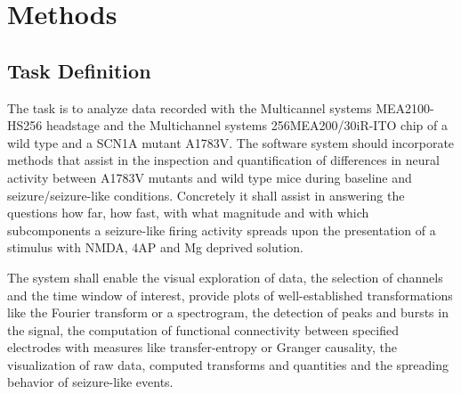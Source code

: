 \documentclass[11pt, twocolumn]{article}
\begin{document}
\section{Methods}
\subsection{Task Definition}
	The task is to analyze data recorded with the Multicannel systems MEA2100-HS256 headstage and the Multichannel systems 256MEA200/30iR-ITO chip of a wild type and a SCN1A mutant A1783V.
	The software system should incorporate methods that assist in the inspection and quantification of differences in neural activity between A1783V mutants and wild type mice during baseline and seizure/seizure-like conditions.
	Concretely it shall assist in answering the questions how far, how fast, with what magnitude and with which subcomponents a seizure-like firing activity spreads upon the presentation of a stimulus with NMDA, 4AP and Mg deprived solution.

	The system shall enable the visual exploration of data, the selection of channels and the time window of interest, provide plots of well-established transformations like the Fourier transform or a spectrogram, the detection of peaks and bursts in the signal, the computation of functional connectivity between specified electrodes with measures like transfer-entropy or Granger causality, the visualization of raw data, computed transforms and quantities and the spreading behavior of seizure-like events.
\end{document}
